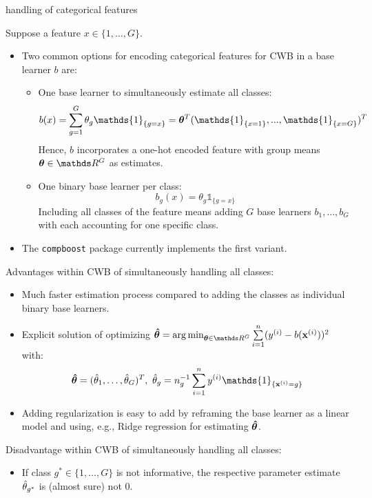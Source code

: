 \documentclass[11pt,compress,t,notes=noshow, xcolor=table]{beamer}
\begin{document}
\begin{vbframe}{handling of categorical features}

Suppose a feature $x \in \{1, \dots, G\}$.
\begin{itemize}
  \item Two common options for encoding categorical features for CWB in a base learner $b$ are:
  \begin{itemize}
    \item 
        One base learner to simultaneously estimate all classes: 
        $$b(x) = \sum_{g=1}^G \theta_g\mathds{1}_{\{g = x\}} = \thetab^T (\mathds{1}_{\{x = 1\}}, ..., \mathds{1}_{\{x = G\}})^T$$
        Hence, $b$ incorporates a one-hot encoded feature with group means $\thetab\in\R^G$ as estimates. 
    
    \item 
        One binary base learner per class:
        $$b_g(x) = \theta_g\mathds{1}_{\{g = x\}}$$  
        Including all classes of the feature means adding $G$ base learners $b_1, \dots, b_G$ with each accounting for one specific class.
  \end{itemize}
  \item The \texttt{compboost} package currently implements the first variant.
\end{itemize}

\framebreak

Advantages within CWB of simultaneously handling all classes: 
\begin{itemize}
    \item 
        Much faster estimation process compared to adding the classes as individual binary base learners.

    \item 
        Explicit solution of optimizing $\thetabh = \argmin_{\thetab\in\R^G}\sumin (\yi - b(\xi))^2$ with:
        $$\thetabh = (\thetah_1, \dots, \thetah_G)^T,\ \thetah_g = n_g^{-1}\sumin \yi \mathds{1}_{\{\xi = g\}}$$

    \item 
        Adding regularization is easy to add by reframing the base learner as a linear model and using, e.g., Ridge regression for estimating $\bm{\hat\theta}$.  
\end{itemize}

Disadvantage within CWB of simultaneously handling all classes: 
\begin{itemize}
    \item 
        If class $g^\ast\in\{1, \dots, G\}$ is not informative, the respective parameter estimate $\hat{\theta}_{g^\ast}$ is (almost sure) not $0$.
\end{itemize}


\end{vbframe}
\end{document}
